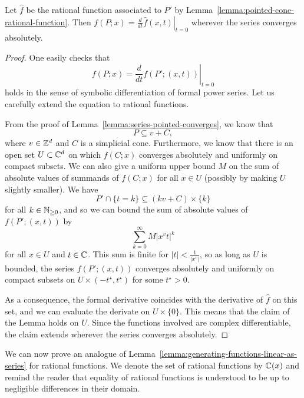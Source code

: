 \begin{lemma}
  Let $\hat f$ be the rational function associated to $P'$ by Lemma~\ref{lemma:pointed-cone-rational-function}.
  Then
  $f(P;x) = \left. \frac{d}{dt} \hat f(x,t) \right\rvert_{t = 0}$
  wherever the series converges absolutely.
\end{lemma}
\begin{proof}
  One easily checks that
  \[
    f(P;x) = \left. \frac{d}{dt} f(P';(x,t)) \right\rvert_{t = 0}
  \]
  holds in the sense of symbolic differentiation of formal power series.
  Let us carefully extend the equation to rational functions.

  From the proof of Lemma~\ref{lemma:series-pointed-converges},
  we know that
  \[
    P \subseteq v + C,
  \]
  where $v \in \mathbb{Z}^d$ and $C$ is a simplicial cone.
  Furthermore, we know that there is an open set $U \subset \mathbb{C}^d$
  on which $f(C;x)$ converges absolutely and uniformly on compact subsets.
  We can also give a uniform upper bound $M$ on the sum of absolute values of summands of $f(C;x)$
  for all $x \in U$ (possibly by making $U$ slightly smaller).
  We have
  \[
    P' \cap \{ t = k \} \subseteq (kv + C) \times \{ k \}
  \]
  for all $k \in \mathbb{N}_{\geq 0}$,
  and so we can bound the sum of absolute values of $f(P';(x,t))$ by
  \[
    \sum_{k=0}^\infty M |x^v t|^k
  \]
  for all $x \in U$ and $t \in \mathbb{C}$.
  This sum is finite for $|t| < \frac{1}{|x^v|}$,
  so as long as $U$ is bounded,
  the series $f(P';(x,t))$ converges absolutely and uniformly on compact subsets on $U \times (-t^\star, t^\star)$ for some $t^\star > 0$.

  As a consequence, the formal derivative coincides with the derivative of $\hat f$ on this set,
  and we can evaluate the derivate on $U \times \{ 0 \}$.
  This means that the claim of the Lemma holds on $U$.
  Since the functions involved are complex differentiable,
  the claim extends wherever the series converges absolutely.
\end{proof}

We can now prove an analogue of Lemma~\ref{lemma:generating-functions-linear-as-series}
for rational functions.
We denote the set of rational functions by $\mathbb{C}(x)$
and remind the reader that equality of rational functions is understood to be up to negligible differences
in their domain.

